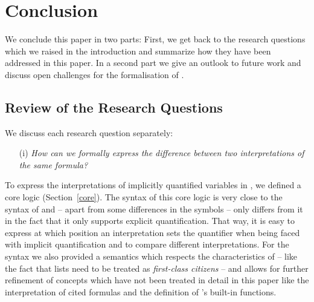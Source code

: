 \section{Conclusion}\label{concl}
We conclude this paper in two parts: First, we get back to the research questions which we raised in the introduction and 
summarize how they have been addressed in this paper. In a second part we give an outlook to future work and 
discuss open challenges for the formalisation of \nthreelogic.


\subsection{Review of the Research Questions}
We discuss each research question separately:
\begin{enumerate}
 \item[(i)] \emph{How can we formally express the difference between two interpretations of the same \nthree formula?}
 \end{enumerate}
 To express the interpretations of implicitly quantified variables in \nthreelogic, we defined a core logic (Section~\ref{core}). The syntax of this 
 core logic is very close to the syntax of \nthree and -- apart from some differences in the symbols -- only differs from it in the fact 
 that it only supports explicit 
 quantification. That way, it is easy to express at which position an interpretation sets the quantifier when being faced with implicit quantification
 and to compare different interpretations. 
 For the syntax we also provided a semantics which respects the characteristics 
 of \nthree{} -- like the fact that lists need to be treated as \emph{first-class citizens} -- and allows for further refinement of concepts which have
 not been treated in detail in this paper like the interpretation 
of cited formulas and the definition of \nthree's built-in functions.

